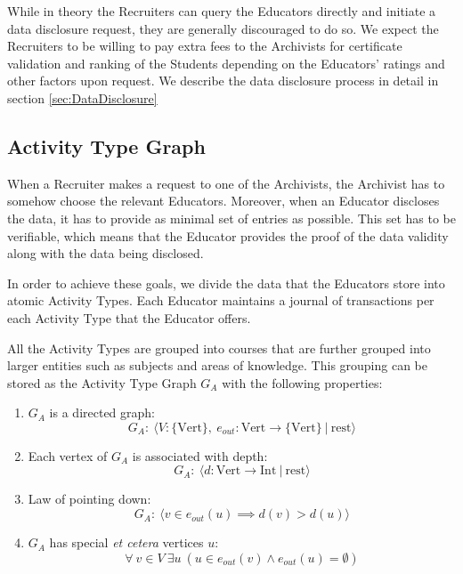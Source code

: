 While in theory the Recruiters can query the Educators directly and initiate a data disclosure request, they are generally discouraged to do so. We expect the Recruiters to be willing to pay extra fees to the Archivists for certificate validation and ranking of the Students depending on the Educators' ratings and other factors upon request. We describe the data disclosure process in detail in section \ref{sec:DataDisclosure}

\subsection{Activity Type Graph}
\label{sec:ATG}
When a Recruiter makes a request to one of the Archivists, the Archivist has to somehow choose the relevant Educators. Moreover, when an Educator discloses the data, it has to provide as minimal set of entries as possible. This set has to be verifiable, which means that the Educator provides the proof of the data validity along with the data being disclosed.

In order to achieve these goals, we divide the data that the Educators store into atomic Activity Types. Each Educator maintains a journal of transactions per each Activity Type that the Educator offers.

All the Activity Types are grouped into courses that are further grouped into larger entities such as subjects and areas of knowledge. This grouping can be stored as the Activity Type Graph $G_A$ with the following properties:
\begin{enumerate}[label=\arabic*${}^\circ$]
\item $G_A$ is a directed graph:
  \begin{equation}
  G_A:\ \langle V: \{\mathrm{Vert}\},\ e_{out}: \mathrm{Vert} \rightarrow \{\mathrm{Vert}\}\ |\ \mathrm{rest} \rangle
  \end{equation}

\item Each vertex of $G_A$ is associated with depth:
  \begin{equation}
  G_A:\ \langle d: \mathrm{Vert} \rightarrow \mathrm{Int}\ |\ \mathrm{rest}  \rangle
  \end{equation}

\item Law of pointing down:
  \begin{equation}
  G_A:\ \langle v \in e_{out}(u) \implies d(v) > d(u) \rangle
  \end{equation}

\item $G_A$ has special \textit{et cetera} vertices $u$:
  \begin{equation}
  \forall\ v \in V\ \exists u\ (u \in e_{out}(v) \land e_{out}(u) = \emptyset)
  \end{equation}
\end{enumerate}

